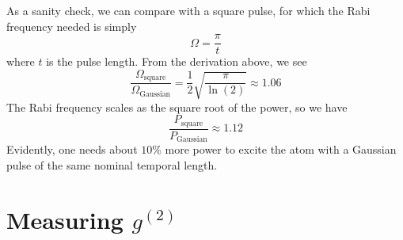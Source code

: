 As a sanity check, we can compare with a square pulse, for which the Rabi frequency needed is simply
\begin{equation}
    \Omega = \frac{\pi}{t}
\end{equation}
where $t$ is the pulse length. From the derivation above, we see \begin{equation}
    \frac{\Omega_{\textrm{square}}}{\Omega_{\textrm{Gaussian}}}=\frac{1}{2}\sqrt{\frac{\pi}{\ln(2)}} \approx 1.06
\end{equation}
The Rabi frequency scales as the square root of the power, so we have
\begin{equation}
\frac{P_{\textrm{square}}}{P_{\textrm{Gaussian}}} \approx 1.12
\end{equation}
Evidently, one needs about $10\%$ more power to excite the atom with a Gaussian pulse of the same nominal temporal length.

\section{Measuring $g^{(2)}$}

